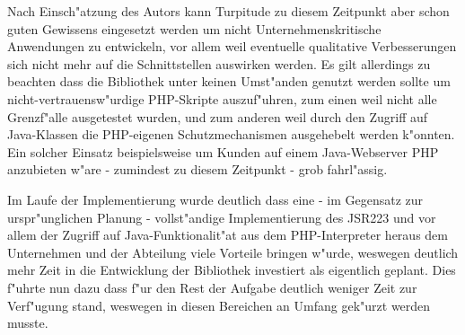 Nach Einsch"atzung des Autors kann Turpitude zu diesem Zeitpunkt aber schon guten Gewissens eingesetzt werden um 
nicht Unternehmenskritische Anwendungen zu entwickeln, vor allem weil eventuelle qualitative Verbesserungen
sich nicht mehr auf die Schnittstellen auswirken werden. Es gilt allerdings zu beachten dass die Bibliothek unter
keinen Umst"anden genutzt werden sollte um nicht-vertrauensw"urdige PHP-Skripte auszuf"uhren, zum einen weil
nicht alle Grenzf"alle ausgetestet wurden, und zum anderen weil durch den Zugriff auf Java-Klassen die PHP-eigenen
Schutzmechanismen ausgehebelt werden k"onnten. Ein solcher Einsatz beispielsweise um Kunden auf einem Java-Webserver 
PHP anzubieten w"are - zumindest zu diesem Zeitpunkt - grob fahrl"assig.

Im Laufe der Implementierung wurde deutlich dass eine - im Gegensatz zur urspr"unglichen Planung - vollst"andige
Implementierung des JSR223 und vor allem der Zugriff auf Java-Funktionalit"at aus dem PHP-Interpreter heraus
dem Unternehmen und der Abteilung viele Vorteile bringen w"urde, weswegen
deutlich mehr Zeit in die Entwicklung der Bibliothek investiert als eigentlich geplant. Dies f"uhrte nun
dazu dass f"ur den Rest der Aufgabe deutlich weniger Zeit zur Verf"ugung stand, weswegen in diesen Bereichen an
Umfang gek"urzt werden musste.

